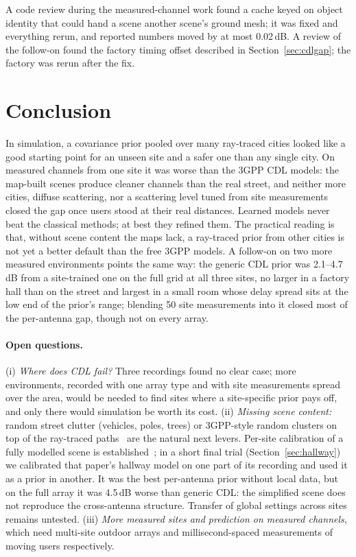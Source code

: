 \documentclass[11pt]{article}
\begin{document}
A code review during the measured-channel work found a cache keyed on object
identity that could hand a scene another scene's ground mesh; it was fixed and
everything rerun, and reported numbers moved by at most 0.02\,dB. A review of
the follow-on found the factory timing offset described in
Section~\ref{sec:cdlgap}; the factory was rerun after the fix.

\section{Conclusion}

In simulation, a covariance prior pooled over many ray-traced cities looked
like a good starting point for an unseen site and a safer one than any single
city. On measured channels from one site it was worse than the 3GPP CDL
models: the map-built scenes produce cleaner channels than the real street,
and neither more cities, diffuse scattering, nor a scattering level tuned from
site measurements closed the gap once users stood at their real distances.
Learned models never beat the classical methods; at best they refined them.
The practical reading is that, without scene content the maps lack, a
ray-traced prior from other cities is not yet a better default than the free
3GPP models. A follow-on on two more measured environments points the same
way: the generic CDL prior was 2.1--4.7\,dB from a site-trained one on the full
grid at all three sites, no larger in a factory hall than on the street and
largest in a small room whose delay spread sits at the low end of the prior's
range; blending 50 site measurements into it closed most of the per-antenna
gap, though not on every array.

\paragraph{Open questions.} (i) \emph{Where does CDL fail?} Three recordings
found no clear case; more environments, recorded with one array type and with
site measurements spread over the area, would be needed to find sites where a
site-specific prior pays off, and only there would simulation be worth its
cost.
(ii) \emph{Missing scene content:} random street clutter (vehicles, poles,
trees) or 3GPP-style random clusters on top of the ray-traced
paths~\cite{tr38901} are the natural next levers. Per-site calibration of a
fully modelled scene is established~\cite{hoydis2023learning}; in a short
final trial (Section~\ref{sec:hallway}) we calibrated that paper's hallway
model on one part of its recording and used it as a prior in another. It was
the best per-antenna prior without local data, but on the full array it was
4.5\,dB worse than generic CDL: the simplified scene does not reproduce the
cross-antenna structure. Transfer of global
settings across sites remains untested. (iii) \emph{More measured sites and
prediction on measured channels}, which need multi-site outdoor arrays and
millisecond-spaced measurements of moving users respectively.
\end{document}
